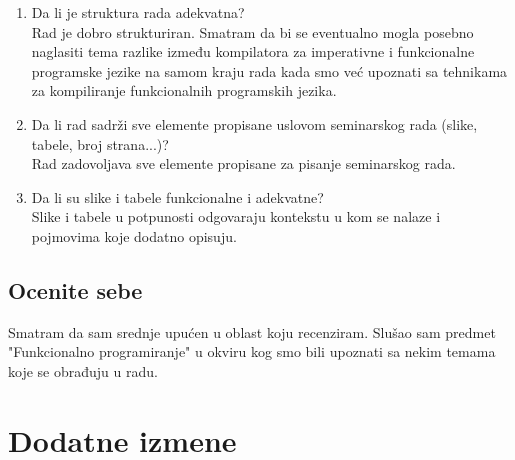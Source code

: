 \documentclass[a4paper]{report}
\begin{document}
\begin{enumerate}
\item Da li je struktura rada adekvatna?\\
Rad je dobro strukturiran. Smatram da bi se eventualno mogla posebno naglasiti tema razlike između kompilatora za imperativne i funkcionalne programske jezike na samom kraju rada kada smo već upoznati sa tehnikama za kompiliranje funkcionalnih programskih jezika.
\item Da li rad sadrži sve elemente propisane uslovom seminarskog rada (slike, tabele, broj strana...)?\\
Rad zadovoljava sve elemente propisane za pisanje seminarskog rada.
\item Da li su slike i tabele funkcionalne i adekvatne?\\
Slike i tabele u potpunosti odgovaraju kontekstu u kom se nalaze i pojmovima koje dodatno opisuju.
\end{enumerate}

\section{Ocenite sebe}

Smatram da sam srednje upućen u oblast koju recenziram. Slušao sam predmet "Funkcionalno programiranje" u okviru kog smo bili upoznati sa nekim temama koje se obrađuju u radu.

\chapter{Dodatne izmene}
\end{document}
